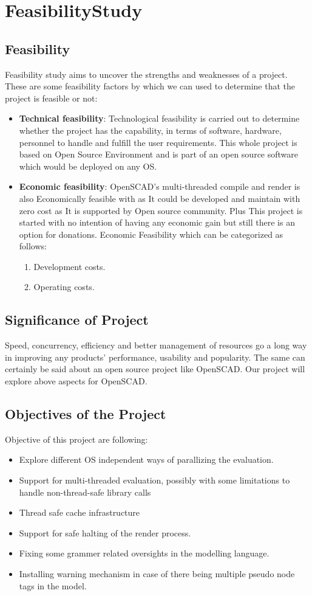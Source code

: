 \chapter{FeasibilityStudy}

\section{Feasibility}
Feasibility study aims to uncover the strengths and weaknesses of
a project. These are some feasibility factors by which we can used to determine that the project is feasible or not:
\begin{itemize}
	\item {\bf{Technical feasibility}}: Technological feasibility is carried out to determine whether the project has the capability, in terms of software, hardware, personnel to handle and fulfill the user requirements. This whole project is based on Open Source Environment and is part of an open source software which would be deployed on any OS.
	\item {\bf{Economic feasibility}}: OpenSCAD's multi-threaded compile and render is also Economically feasible with as It could be developed and maintain with zero cost as It is supported by Open source community. Plus This project is started with no intention of having any economic gain but still there is an option for donations. Economic Feasibility which can be categorized as follows:
		\begin{enumerate}
			\item Development costs.
			\item Operating costs.
		\end{enumerate}														
\end{itemize}


\section{Significance of Project}
Speed, concurrency, efficiency and better management of resources go a long way in improving any products' performance, usability and popularity. The same can certainly be said about an open source project like OpenSCAD.
Our project will explore above aspects for OpenSCAD.


\section{Objectives of the Project}
Objective of this project are following:
\begin{itemize}
\item Explore different OS independent ways of parallizing the evaluation.
\item Support for multi-threaded evaluation, possibly with some limitations to handle non-thread-safe library calls
\item Thread safe cache infrastructure
\item Support for safe halting of the render process.
\item Fixing some grammer related oversights in the modelling language.
\item Installing warning mechanism in case of there being multiple pseudo node tags in the model.
\end{itemize}
